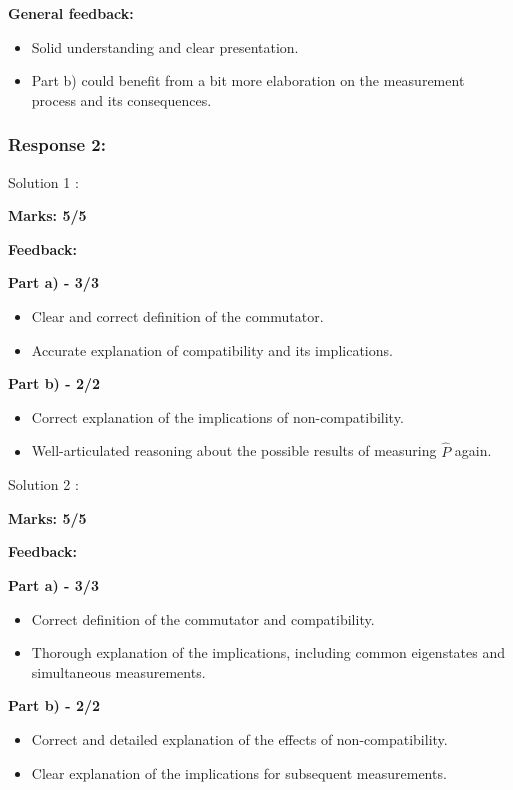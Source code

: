 \documentclass[a4paper,11pt]{article}
\begin{document}
\textbf{General feedback:}

\begin{itemize}
    \item Solid understanding and clear presentation.
    \item Part b) could benefit from a bit more elaboration on the measurement process and its consequences.
\end{itemize}



\subsubsection*{Response 2:}

Solution 1 :

\textbf{Marks: 5/5}

\textbf{Feedback:}

\textbf{Part a) - 3/3}

\begin{itemize}
    \item Clear and correct definition of the commutator.
    \item Accurate explanation of compatibility and its implications.
\end{itemize}

\textbf{Part b) - 2/2}

\begin{itemize}
    \item Correct explanation of the implications of non-compatibility.
    \item Well-articulated reasoning about the possible results of measuring $\hat{P}$ again.
\end{itemize}


Solution 2 :

\textbf{Marks: 5/5}

\textbf{Feedback:}

\textbf{Part a) - 3/3}

\begin{itemize}
    \item Correct definition of the commutator and compatibility.
    \item Thorough explanation of the implications, including common eigenstates and simultaneous measurements.
\end{itemize}

\textbf{Part b) - 2/2}

\begin{itemize}
    \item Correct and detailed explanation of the effects of non-compatibility.
    \item Clear explanation of the implications for subsequent measurements.
\end{itemize}
\end{document}
